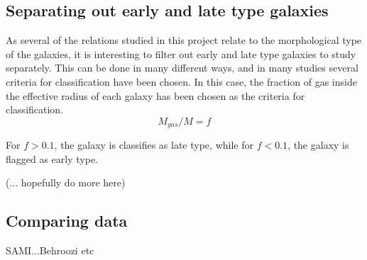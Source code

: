 \subsection{Separating out early and late type galaxies}
As several of the relations studied in this project relate to the morphological type of the galaxies, it is interesting to filter out early and late type galaxies to study separately. This can be done in many different ways, and in many studies several criteria for classification have been chosen. In this case, the fraction of gas inside the effective radius of each galaxy has been chosen as the criteria for classification.
\begin{equation}
    M_{gas}/M  = f
\end{equation}

For $f > 0.1$, the galaxy is classifies as late type, while for $f< 0.1$, the galaxy is flagged as early type.

(... hopefully do more here)

\subsection{Comparing data}
SAMI...Behroozi etc